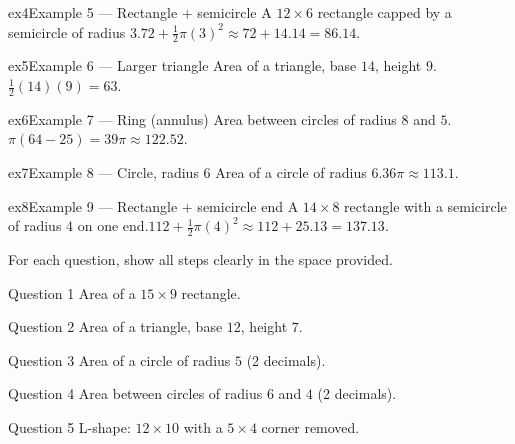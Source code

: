 \documentclass[11pt]{article}
\begin{document}
\begin{example}{ex4}{Example 5 --- Rectangle + semicircle}
A $12\times6$ rectangle capped by a semicircle of radius $3$.\soln $72+\tfrac12\pi(3)^2\approx72+14.14=86.14$.
\end{example}

\begin{example}{ex5}{Example 6 --- Larger triangle}
Area of a triangle, base $14$, height $9$.\soln $\tfrac12(14)(9)=63$.
\end{example}

\begin{example}{ex6}{Example 7 --- Ring (annulus)}
Area between circles of radius $8$ and $5$.\soln $\pi(64-25)=39\pi\approx122.52$.
\end{example}

\begin{example}{ex7}{Example 8 --- Circle, radius 6}
Area of a circle of radius $6$.\soln $36\pi\approx113.1$.
\end{example}

\begin{example}{ex8}{Example 9 --- Rectangle + semicircle end}
A $14\times8$ rectangle with a semicircle of radius $4$ on one end.\soln $112+\tfrac12\pi(4)^2\approx112+25.13=137.13$.
\end{example}

\clearpage
{}
For each question, show all steps clearly in the space provided.

\begin{qbox}{Question 1}
Area of a $15\times9$ rectangle.\workspace{2.4cm}
\end{qbox}

\begin{qbox}{Question 2}
Area of a triangle, base $12$, height $7$.\workspace{2.4cm}
\end{qbox}

\begin{qbox}{Question 3}
Area of a circle of radius $5$ (2 decimals).\workspace{2.4cm}
\end{qbox}

\begin{qbox}{Question 4}
Area between circles of radius $6$ and $4$ (2 decimals).\workspace{2.4cm}
\end{qbox}

\begin{qbox}{Question 5}
L-shape: $12\times10$ with a $5\times4$ corner removed.\workspace{2.4cm}
\end{qbox}
\end{document}
